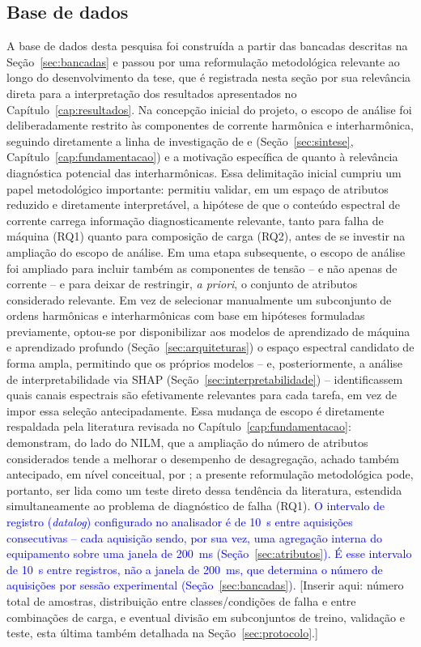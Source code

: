 \documentclass[times,final]{elsarticle}
\begin{document}
\subsection{Base de dados}
\label{sec:bd}
A base de dados desta pesquisa foi construída a partir das bancadas descritas na Seção~\ref{sec:bancadas} e passou por uma reformulação metodológica relevante ao longo do desenvolvimento da tese, que é registrada nesta seção por sua relevância direta para a interpretação dos resultados apresentados no Capítulo~\ref{cap:resultados}.
Na concepção inicial do projeto, o escopo de análise foi deliberadamente restrito às componentes de corrente harmônica e interharmônica, seguindo diretamente a linha de investigação de \citet{djordjevic2017} e \citet{bouhouras2017} (Seção~\ref{sec:sintese}, Capítulo~\ref{cap:fundamentacao}) e a motivação específica de \citet{efe2016} quanto à relevância diagnóstica potencial das interharmônicas. Essa delimitação inicial cumpriu um papel metodológico importante: permitiu validar, em um espaço de atributos reduzido e diretamente interpretável, a hipótese de que o conteúdo espectral de corrente carrega informação diagnosticamente relevante, tanto para falha de máquina (RQ1) quanto para composição de carga (RQ2), antes de se investir na ampliação do escopo de análise.
Em uma etapa subsequente, o escopo de análise foi ampliado para incluir também as componentes de tensão -- e não apenas de corrente -- e para deixar de restringir, \textit{a priori}, o conjunto de atributos considerado relevante. Em vez de selecionar manualmente um subconjunto de ordens harmônicas e interharmônicas com base em hipóteses formuladas previamente, optou-se por disponibilizar aos modelos de aprendizado de máquina e aprendizado profundo (Seção~\ref{sec:arquiteturas}) o espaço espectral candidato de forma ampla, permitindo que os próprios modelos -- e, posteriormente, a análise de interpretabilidade via SHAP (Seção~\ref{sec:interpretabilidade}) -- identificassem quais canais espectrais são efetivamente relevantes para cada tarefa, em vez de impor essa seleção antecipadamente. Essa mudança de escopo é diretamente respaldada pela literatura revisada no Capítulo~\ref{cap:fundamentacao}: \citet{li2019moea} demonstram, do lado do NILM, que a ampliação do número de atributos considerados tende a melhorar o desempenho de desagregação, achado também antecipado, em nível conceitual, por \citet{zeifman2011}; a presente reformulação metodológica pode, portanto, ser lida como um teste direto dessa tendência da literatura, estendida simultaneamente ao problema de diagnóstico de falha (RQ1).
\textcolor{blue}{O intervalo de registro (\textit{datalog}) configurado no analisador é de 10~s entre aquisições consecutivas -- cada aquisição sendo, por sua vez, uma agregação interna do equipamento sobre uma janela de 200~ms (Seção~\ref{sec:atributos}). É esse intervalo de 10~s entre registros, não a janela de 200~ms, que determina o número de aquisições por sessão experimental (Seção~\ref{sec:bancadas}).} [Inserir aqui: número total de amostras, distribuição entre classes/condições de falha e entre combinações de carga, e eventual divisão em subconjuntos de treino, validação e teste, esta última também detalhada na Seção~\ref{sec:protocolo}.]
\end{document}

